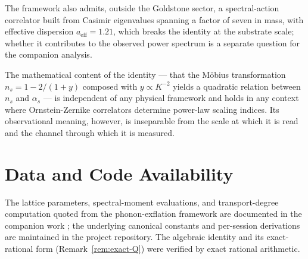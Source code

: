 \documentclass[12pt]{article}
\theoremstyle{definition}
\theoremstyle{remark}
\begin{document}
The framework also admits, outside the Goldstone sector, a spectral-action correlator built from Casimir eigenvalues spanning a factor of seven in mass, with effective dispersion $a_{\mathrm{eff}} = 1.21$, which breaks the identity at the substrate scale; whether it contributes to the observed power spectrum is a separate question for the companion analysis.

The mathematical content of the identity --- that the M\"obius transformation $n_s = 1 - 2/(1+y)$ composed with $y \propto K^{-2}$ yields a quadratic relation between $n_s$ and $\alpha_s$ --- is independent of any physical framework and holds in any context where Ornstein-Zernike correlators determine power-law scaling indices. Its observational meaning, however, is inseparable from the scale at which it is read and the channel through which it is measured.

\section*{Data and Code Availability}

The lattice parameters, spectral-moment evaluations, and transport-degree computation quoted from the phonon-exflation framework are documented in the companion work \citep{PhononExflation}; the underlying canonical constants and per-session derivations are maintained in the project repository. The algebraic identity and its exact-rational form (Remark~\ref{rem:exact-Q}) were verified by exact rational arithmetic.



\end{document}
